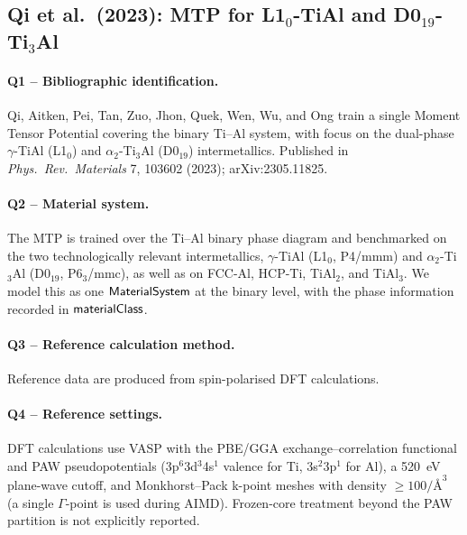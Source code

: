 \subsection{Qi et al.\ (2023): MTP for L1$_0$-TiAl and D0$_{19}$-Ti$_3$Al}
\label{sec:appendix-example-qi2023}

\paragraph{Q1 -- Bibliographic identification.}
Qi, Aitken, Pei, Tan, Zuo, Jhon, Quek, Wen, Wu, and Ong train a single
Moment Tensor Potential covering the binary Ti--Al system, with focus on
the dual-phase $\gamma$-TiAl (L1$_0$) and $\alpha_2$-Ti$_3$Al
(D0$_{19}$) intermetallics. Published in \emph{Phys.\ Rev.\ Materials}
7, 103602 (2023); arXiv:2305.11825.


\paragraph{Q2 -- Material system.}
The MTP is trained over the Ti--Al binary phase diagram and benchmarked
on the two technologically relevant intermetallics, $\gamma$-TiAl
(L1$_0$, P4/mmm) and $\alpha_2$-Ti$_3$Al (D0$_{19}$, P6$_3$/mmc), as
well as on FCC-Al, HCP-Ti, TiAl$_2$, and TiAl$_3$. We model this as
one $\mathsf{MaterialSystem}$ at the binary level, with the phase information
recorded in $\mathsf{materialClass}$.


\paragraph{Q3 -- Reference calculation method.}
Reference data are produced from spin-polarised DFT calculations.


\paragraph{Q4 -- Reference settings.}
DFT calculations use VASP with the PBE/GGA exchange--correlation
functional and PAW pseudopotentials (3p$^6$3d$^3$4s$^1$ valence for
Ti, 3s$^2$3p$^1$ for Al), a 520~eV plane-wave cutoff, and
Monkhorst--Pack k-point meshes with density $\geq 100/\text{\AA}^3$
(a single $\Gamma$-point is used during AIMD). Frozen-core treatment
beyond the PAW partition is not explicitly reported.


